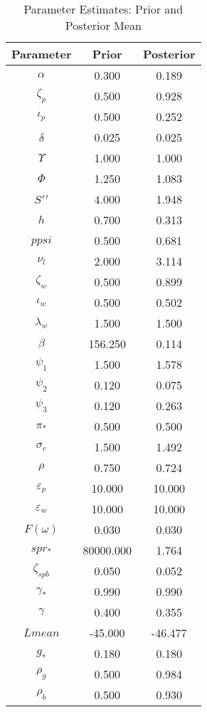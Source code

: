\documentclass[12pt]{article}
\begin{document}
\pagestyle{empty}
\begin{table}[h]
\centering
\caption{Parameter Estimates: Prior and Posterior Mean}
\vspace*{.5cm}
\begin{tabular}{ccc}\hline 
 Parameter & Prior & Posterior  \tabularnewline \hline
$\alpha$ &    0.300 &    0.189 \\
$\zeta_p$ &    0.500 &    0.928 \\
$\iota_p$ &    0.500 &    0.252 \\
$\delta$ &    0.025 &    0.025 \\
$\mathcal{\Upsilon}$ &    1.000 &    1.000 \\
$\Phi$ &    1.250 &    1.083 \\
$S\prime\prime$ &    4.000 &    1.948 \\
$   h$ &    0.700 &    0.313 \\
$ppsi$ &    0.500 &    0.681 \\
$\nu_l$ &    2.000 &    3.114 \\
$\zeta_w$ &    0.500 &    0.899 \\
$\iota_w$ &    0.500 &    0.502 \\
$\lambda_w$ &    1.500 &    1.500 \\
$\beta $ &  156.250 &    0.114 \\
$\psi_1$ &    1.500 &    1.578 \\
$\psi_2$ &    0.120 &    0.075 \\
$\psi_3$ &    0.120 &    0.263 \\
$\pi_*$ &    0.500 &    0.500 \\
$\sigma_{c}$ &    1.500 &    1.492 \\
$\rho$ &    0.750 &    0.724 \\
$\varepsilon_{p}$ &   10.000 &   10.000 \\
$\varepsilon_{w}$ &   10.000 &   10.000 \\
$F(\omega)$ &    0.030 &    0.030 \\
$spr_*$ & 80000.000 &    1.764 \\
$\zeta_{spb}$ &    0.050 &    0.052 \\
$\gamma_*$ &    0.990 &    0.990 \\
$\gamma$ &    0.400 &    0.355 \\
$Lmean$ &  -45.000 &  -46.477 \\
$ g_*$ &    0.180 &    0.180 \\
$\rho_g$ &    0.500 &    0.984 \\
$\rho_b$ &    0.500 &    0.930 \\

\end{tabular}
\end{table}
\end{document}
